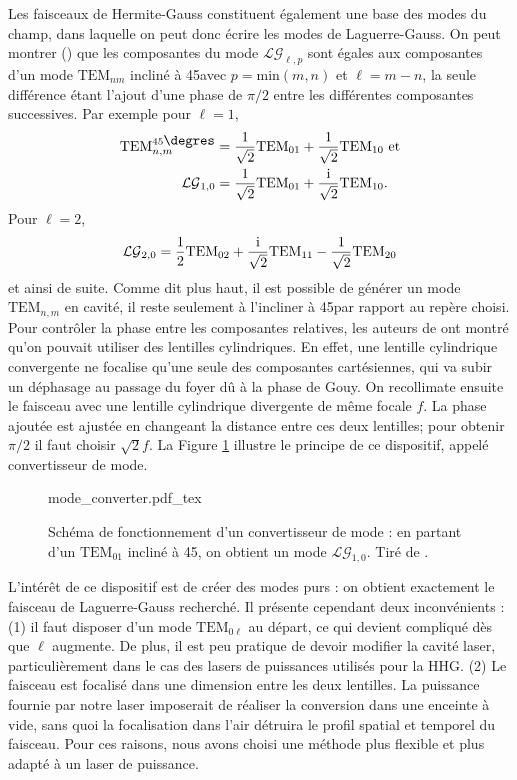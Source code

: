 Les faisceaux de Hermite-Gauss constituent également une base des modes du champ, dans laquelle on peut donc écrire les modes de Laguerre-Gauss. On peut montrer () que les composantes du mode $\mathcal{LG}_{\ell,p}$ sont égales aux composantes d'un mode $\mbox{TEM}_{nm}$ incliné à 45\degres avec $p = \mathrm{min}(m,n)$ et $\ell=m-n$, la seule différence étant l'ajout d'une phase de $\pi/2$ entre les différentes composantes successives. Par exemple pour $\ell = 1$,
\begin{align*}
\mbox{TEM}_{n,m}^{45\mbox{\degres}}&=\frac{1}{\sqrt{2}}\mbox{TEM}_{01}+\frac{1}{\sqrt{2}}\mbox{TEM}_{10} \mbox{ et}\\
\mathcal{LG}_{1,0}&=\frac{1}{\sqrt{2}}\mbox{TEM}_{01}+\frac{\rmi}{\sqrt{2}}\mbox{TEM}_{10}.
\end{align*}
Pour $\ell = 2$, 
\begin{equation*}
\mathcal{LG}_{2,0}=\frac{1}{2}\mbox{TEM}_{02}+\frac{\mathrm{i}}{\sqrt{2}}\mbox{TEM}_{11}-\frac{1}{\sqrt{2}}\mbox{TEM}_{20}
\end{equation*}
et ainsi de suite.
Comme dit plus haut, il est possible de générer un mode $\mbox{TEM}_{n,m}$ en cavité, il reste seulement à l'incliner à 45\degres par rapport au repère choisi. Pour contrôler la phase entre les composantes relatives, les auteurs de  ont montré qu'on pouvait utiliser des lentilles cylindriques. En effet, une lentille cylindrique convergente ne focalise qu'une seule des composantes cartésiennes, qui va subir un déphasage au passage du foyer dû à la phase de Gouy. On recollimate ensuite le faisceau avec une lentille cylindrique divergente de même focale $f$. La phase ajoutée est ajustée en changeant la distance entre ces deux lentilles; pour obtenir $\pi/2$ il faut choisir $\sqrt{2}f$. La Figure \ref{Fig:Modeconv} illustre le principe de ce dispositif, appelé convertisseur de mode.

\begin{figure}[!ht]
\centering
\def\svgwidth{0.5\columnwidth}
{mode_converter.pdf_tex}
\caption{Schéma de fonctionnement d'un convertisseur de mode : en partant d'un $\mbox{TEM}_{01}$ incliné à 45\degres, on obtient un mode $\mathcal{LG}_{1,0}$. Tiré de .}
\label{Fig:Modeconv}
\end{figure}

L'intérêt de ce dispositif est de créer des modes purs : on obtient exactement le faisceau de Laguerre-Gauss recherché. Il présente cependant deux inconvénients : (1) il faut disposer d'un mode $\mbox{TEM}_{0\ell}$ au départ, ce qui devient compliqué dès que $\ell$ augmente. De plus, il est peu pratique de devoir modifier la cavité laser, particulièrement dans le cas des lasers de puissances utilisés pour la HHG. (2) Le faisceau est focalisé dans une dimension entre les deux lentilles. La puissance fournie par notre laser imposerait de réaliser la conversion dans une enceinte à vide, sans quoi la focalisation dans l'air détruira le profil spatial et temporel du faisceau. Pour ces raisons, nous avons choisi une méthode plus flexible et plus adapté à un laser de puissance.

